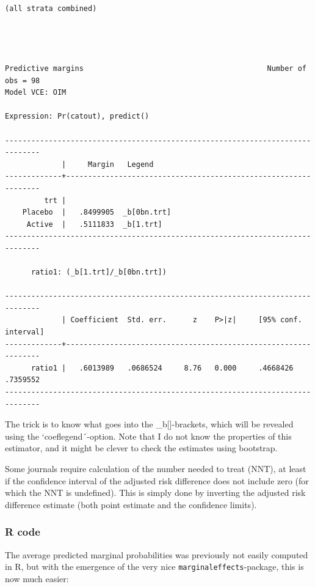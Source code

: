 \documentclass[
]{book}
\begin{document}
\begin{verbatim}
(all strata combined)




Predictive margins                                          Number of obs = 98
Model VCE: OIM

Expression: Pr(catout), predict()

------------------------------------------------------------------------------
             |     Margin   Legend
-------------+----------------------------------------------------------------
         trt |
    Placebo  |   .8499905  _b[0bn.trt]
     Active  |   .5111833  _b[1.trt]
------------------------------------------------------------------------------

      ratio1: (_b[1.trt]/_b[0bn.trt])

------------------------------------------------------------------------------
             | Coefficient  Std. err.      z    P>|z|     [95% conf. interval]
-------------+----------------------------------------------------------------
      ratio1 |   .6013989   .0686524     8.76   0.000     .4668426    .7359552
------------------------------------------------------------------------------
\end{verbatim}

The trick is to know what goes into the \_b{[}{]}-brackets, which will be revealed using the `coeflegend´-option. Note that I do not know the properties of this estimator, and it might be clever to check the estimates using bootstrap.

Some journals require calculation of the number needed to treat (NNT), at least if the confidence interval of the adjusted risk difference does not include zero (for which the NNT is undefined). This is simply done by inverting the adjusted risk difference estimate (both point estimate and the confidence limits).

\subsubsection{R code}\label{r-code-2}

The average predicted marginal probabilities was previously not easily computed in R, but with the emergence of the very nice \texttt{marginaleffects}-package, this is now much easier:
\end{document}
